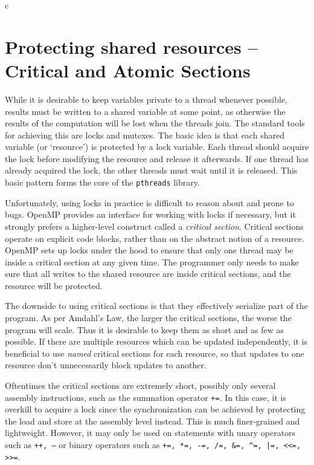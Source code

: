 \documentclass[conference, a4paper]{IEEEtran-modified}
\begin{document}
\begin{ccode}[]{c}
\section{Protecting shared resources -- Critical and Atomic Sections}

  While it is desirable to keep variables private to a thread whenever possible, results must be written to a shared variable at some point, as otherwise the results of the computation will be lost when the threads join. The standard tools for achieving this are locks and mutexes. The basic idea is that each shared variable (or `resource') is protected by a lock variable. Each thread should acquire the lock before modifying the resource and release it afterwards. If one thread has already acquired the lock, the other threads must wait until it is released. This basic pattern forms the core of the \texttt{pthreads} library. 

  Unfortunately, using locks in practice is difficult to reason about and prone to bugs. OpenMP provides an interface for working with locks if necessary, but it strongly prefers a higher-level construct called a \emph{critical section}. Critical sections operate on explicit code blocks, rather than on the abstract notion of a resource. OpenMP sets up locks under the hood to ensure that only one thread may be inside a critical section at any given time. The programmer only needs to make sure that all writes to the shared resource are inside critical sections, and the resource will be protected.

  The downside to using critical sections is that they effectively serialize part of the program. As per Amdahl's Law, the larger the critical sections, the worse the program will scale. Thus it is desirable to keep them as short and as few as possible. If there are multiple resources which can be updated independently, it is beneficial to use \emph{named} critical sections for each resource, so that updates to one resource don't unnecessarily block updates to another.

  Oftentimes the critical sections are extremely short, possibly only several assembly instructions, such as the summation operator \texttt{+=}. In this case, it is overkill to acquire a lock since the synchronization can be achieved by protecting the load and store at the assembly level instead. This is much finer-grained and lightweight. However, it may only be used on statements with unary operators such as \texttt{++, --} or binary operators such as \texttt{+=, *=, -=, /=, &=, ^=, |=, <<=, >>=}. 


\end{ccode}
\end{document}
